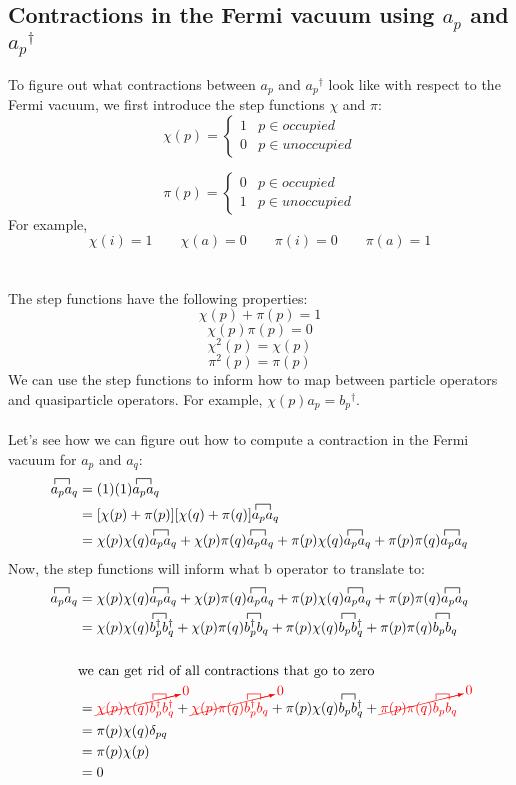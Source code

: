 \documentclass{article}
\newcommand{\fctr}{\contraction}
\newcommand{\dg}{\ensuremath{^\dagger} }
\def\cre#1{{\color{red}#1}}
\begin{document}
\subsection{Contractions in the Fermi vacuum using $a_p$ and $a_p\dg$}
To figure out what contractions between $a_p$ and $a_p\dg$ look like with respect to the Fermi vacuum, we first introduce the step functions $\chi$ and 
$\pi$: 
\[
\chi (p) =
    \begin{cases}
      1  & p \in occupied \\
      0 & p \in unoccupied
    \end{cases}       
\]

\[
  \pi(p) =
    \begin{cases}
      0  & p \in occupied \\
      1  & p \in unoccupied
    \end{cases}       
\]
For example, 
\[\chi(i) = 1 \quad  \quad \chi(a) = 0 \quad  \quad \pi(i) = 0 \quad   \quad \pi(a) = 1\]
\\ \\
The step functions have the following properties: 
 \[\chi(p) + \pi(p) = 1 \]
 \[\chi(p)\pi(p) = 0 \]
\[\chi^2(p) = \chi(p) \]
\[\pi^2(p) = \pi(p) \]
We can use the step functions to inform how to map between particle operators and quasiparticle operators.
For example, $\chi(p)a_p = b_p\dg$.\\ \\ 
Let's see how we can figure out how to compute a contraction in the Fermi vacuum for $a_p$ and $a_q$: 
\begin{align*}
 \fctr{}{a}{{}_p}{a}
 a_p a_q  &=(1)(1) \fctr{}{a}{{}_p}{a} a_p a_q \\
  &= [\chi(p) + \pi(p)][\chi(q) + \pi(q)] \fctr{}{a}{{}_p}{a} a_p a_q \\
 &= \chi(p)\chi(q)\fctr{}{a}{{}_p}{a} a_p a_q + \chi(p) \pi(q) \fctr{}{a}{{}_p}{a} a_p a_q  +  \pi(p)\chi(q) \fctr{}{a}{{}_p}{a} a_p a_q  + 
 \pi(p) \pi(q) \fctr{}{a}{{}_p}{a} a_p a_q 
\end{align*}
Now, the step functions will inform what b operator to translate to: 
\begin{align*}
 \fctr{}{a}{{}_p}{a}a_p a_q 
 &= \chi(p)\chi(q)\fctr{}{a}{{}_p}{a} a_p a_q + \chi(p) \pi(q) \fctr{}{a}{{}_p}{a} a_p a_q  +  \pi(p)\chi(q) \fctr{}{a}{{}_p}{a} a_p a_q  + 
 \pi(p) \pi(q) \fctr{}{a}{{}_p}{a} a_p a_q  \\
&= \chi(p)\chi(q)\fctr{}{b}{{}_p\dg}{b} b_p\dg b_q\dg + \chi(p) \pi(q) \fctr{}{b}{{}_p\dg}{b} b_p\dg b_q  +  \pi(p)\chi(q) \fctr{}{b}{{}_p}{b} b_p b_q\dg  + 
 \pi(p) \pi(q) \fctr{}{b}{{}_p}{b} b_p b_q \\ \\
&  \text{we can get rid of all contractions that go to zero} \\
&= \cre{\cancelto{0}{\chi(p)\chi(q)\fctr{}{b}{{}_p\dg}{b} b_p\dg b_q\dg}} + \cre{\cancelto{0}{\chi(p) \pi(q) \fctr{}{b}{{}_p\dg}{b} b_p\dg b_q}}  +  \pi(p)\chi(q) \fctr{}{b}{{}_p}{b} b_p b_q\dg  + 
\cre{\cancelto{0}{ \pi(p) \pi(q) \fctr{}{b}{{}_p}{b} b_p b_q }}\\
&=  \pi(p)\chi(q) \delta_{pq} \\
&=  \pi(p)\chi(p) \\
&= 0 
\end{align*}
\end{document}
